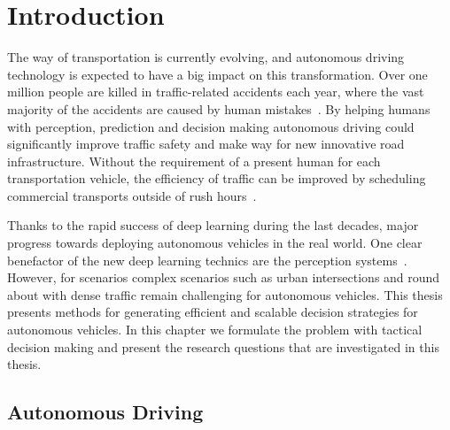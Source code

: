 \chapter{Introduction}\label{chapter:intro}
The way of transportation is currently evolving, and autonomous driving technology is expected to have a big impact on this transformation. Over one million people are killed in traffic-related accidents each year, where the vast majority of the accidents are caused by human mistakes~\cite{WHO2018, NHTSA2018}. By helping humans with perception, prediction and decision making autonomous driving could significantly improve traffic safety and make way for new innovative road infrastructure. Without the requirement of a present human for each transportation vehicle, the efficiency of traffic can be improved by scheduling commercial transports outside of rush hours~\cite{FAGNANT2015167}.



Thanks to the rapid success of deep learning during the last decades, major progress towards deploying autonomous vehicles in the real world. One clear benefactor of the new deep learning technics are the perception systems~\cite{Janai2020}. 
However, for scenarios complex scenarios such as urban intersections and round about with dense traffic remain challenging for autonomous vehicles. 
This thesis presents methods for generating efficient and scalable decision strategies for autonomous vehicles. In this chapter we formulate the problem with tactical decision making and present the research questions that are investigated in this thesis. 

\section{Autonomous Driving}

